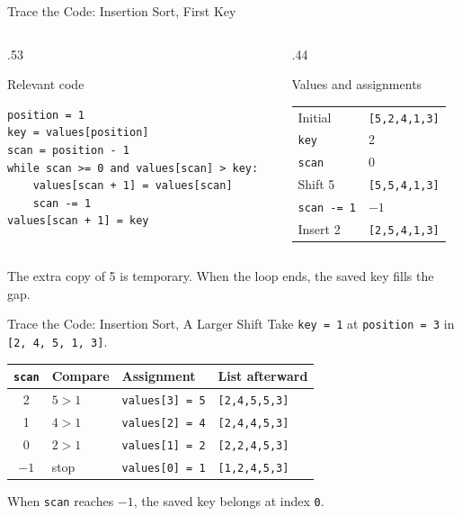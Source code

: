 \documentclass[aspectratio=169,10pt]{beamer}
\begin{document}
\begin{frame}[fragile]{Trace the Code: Insertion Sort, First Key}
\small
\begin{columns}[T,onlytextwidth]
\begin{column}{.53\textwidth}
\begin{block}{Relevant code}
\scriptsize
\begin{verbatim}
position = 1
key = values[position]
scan = position - 1
while scan >= 0 and values[scan] > key:
    values[scan + 1] = values[scan]
    scan -= 1
values[scan + 1] = key
\end{verbatim}
\end{block}
\end{column}
\begin{column}{.44\textwidth}
\begin{block}{Values and assignments}
\footnotesize
\begin{tabular}{ll}
Initial & \texttt{[5,2,4,1,3]}\\
\texttt{key} & 2\\
\texttt{scan} & 0\\
Shift 5 & \texttt{[5,5,4,1,3]}\\
\texttt{scan -= 1} & $-1$\\
Insert 2 & \texttt{[2,5,4,1,3]}
\end{tabular}
\end{block}
\end{column}
\end{columns}
\begin{keyidea}The extra copy of 5 is temporary. When the loop ends, the saved key fills the gap.\end{keyidea}
\end{frame}

\begin{frame}{Trace the Code: Insertion Sort, A Larger Shift}
\small
Take \texttt{key = 1} at \texttt{position = 3} in \texttt{[2, 4, 5, 1, 3]}.
\begin{center}
\begin{tabular}{clll}
\texttt{scan} & Compare & Assignment & List afterward\\\hline
2 & $5>1$ & \texttt{values[3] = 5} & \texttt{[2,4,5,5,3]}\\
1 & $4>1$ & \texttt{values[2] = 4} & \texttt{[2,4,4,5,3]}\\
0 & $2>1$ & \texttt{values[1] = 2} & \texttt{[2,2,4,5,3]}\\
$-1$ & stop & \texttt{values[0] = 1} & \texttt{[1,2,4,5,3]}
\end{tabular}
\end{center}
\begin{keyidea}When \texttt{scan} reaches $-1$, the saved key belongs at index \texttt{0}.\end{keyidea}
\end{frame}
\end{document}

